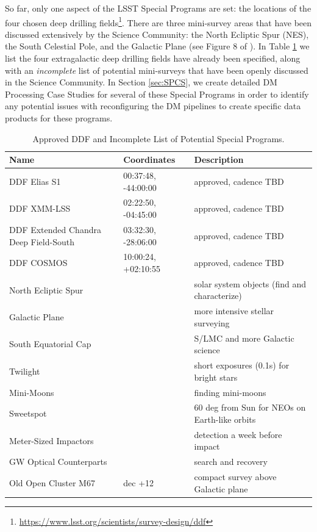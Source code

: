 \documentclass[DM,lsstdoc,toc]{lsstdoc}
\begin{document}
So far, only one aspect of the LSST Special Programs are set: the locations of the four chosen deep drilling fields\footnote{\url{https://www.lsst.org/scientists/survey-design/ddf}}. There are three mini-survey areas that have been discussed extensively by the Science Community: the North Ecliptic Spur (NES), the South Celestial Pole, and the Galactic Plane (see Figure 8 of \citep{2008arXiv0805.2366I}). In Table \ref{tab:ddfms} we list the four extragalactic deep drilling fields have already been specified, along with an \textit{incomplete} list of potential mini-surveys that have been openly discussed in the Science Community. In Section \ref{sec:SPCS}, we create detailed DM Processing Case Studies for several of these Special Programs in order to identify any potential issues with reconfiguring the DM pipelines to create specific data products for these programs.

\begin{table}[h]
\begin{center}
\begin{footnotesize}
\caption{Approved DDF and Incomplete List of Potential Special Programs.}
\label{tab:ddfms}
\begin{tabular}{lll}
\hline \hline
Name & Coordinates & Description  \\
\hline
DDF Elias S1    & 00:37:48, -44:00:00  & approved, cadence TBD \\
DDF XMM-LSS & 02:22:50, -04:45:00  & approved, cadence TBD  \\
DDF Extended Chandra Deep Field-South & 03:32:30, -28:06:00  & approved, cadence TBD  \\
DDF COSMOS  & 10:00:24, +02:10:55 & approved, cadence TBD  \\
\hline
North Ecliptic Spur      & & solar system objects (find and characterize) \\
Galactic Plane             & & more intensive stellar surveying \\
South Equatorial Cap  & & S/LMC and more Galactic science \\
Twilight                        & & short exposures (0.1s) for bright stars \\
Mini-Moons                     &  & finding mini-moons \\
Sweetspot                       & & 60 deg from Sun for NEOs on Earth-like orbits \\
Meter-Sized Impactors     & & detection a week before impact \\
GW Optical Counterparts & & search and recovery \\
Old Open Cluster M67      & dec +12 & compact survey above Galactic plane  \\
\hline
\end{tabular}
\end{footnotesize}
\end{center}
\end{table}
\end{document}
